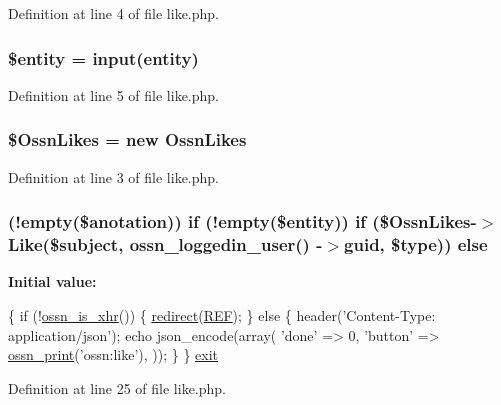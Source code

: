 Definition at line 4 of file like.\+php.

\subsubsection[{\texorpdfstring{\$entity}{$entity}}]{\setlength{\rightskip}{0pt plus 5cm}\$entity = {\bf input}(\textquotesingle{}entity\textquotesingle{})}\hypertarget{post_2like_8php_a74ed34e6d7bc9f3f8c4fb58a12247ee2}{}\label{post_2like_8php_a74ed34e6d7bc9f3f8c4fb58a12247ee2}


Definition at line 5 of file like.\+php.

\subsubsection[{\texorpdfstring{\$\+Ossn\+Likes}{$OssnLikes}}]{\setlength{\rightskip}{0pt plus 5cm}\${\bf Ossn\+Likes} = new {\bf Ossn\+Likes}}\hypertarget{post_2like_8php_a227f36ff099a95468945a2fabc5c0782}{}\label{post_2like_8php_a227f36ff099a95468945a2fabc5c0782}


Definition at line 3 of file like.\+php.

\subsubsection[{\texorpdfstring{else}{else}}]{ (!empty(\$anotation)) {\bf if} (!empty(\$entity)) {\bf if} (\${\bf Ossn\+Likes}-\/$>$Like(\$subject, {\bf ossn\+\_\+loggedin\+\_\+user}() -\/$>$guid, \${\bf type})) else}\hypertarget{post_2like_8php_a3aaa36ba6f23d1f679c0e517506ae7b6}{}\label{post_2like_8php_a3aaa36ba6f23d1f679c0e517506ae7b6}
{\bfseries Initial value\+:}
\begin{DoxyCode}
\{
    \textcolor{keywordflow}{if} (!\hyperlink{ossn_8lib_8system_8php_ac764e738f5c840432bbe4771e4fa27a7}{ossn\_is\_xhr}()) \{
        \hyperlink{ossn_8lib_8system_8php_a33cafdb93398ec540993c12c1daa0c48}{redirect}(\hyperlink{ossn_8lib_8system_8php_a6141904c50990cdd468f07046f29bb5c}{REF});
    \} \textcolor{keywordflow}{else} \{
        header(\textcolor{stringliteral}{'Content-Type: application/json'});
        echo json\_encode(array(
                \textcolor{stringliteral}{'done'} => 0,
                \textcolor{stringliteral}{'button'} => \hyperlink{ossn_8lib_8languages_8php_a2be5d1c4b695593a9b9067b96df2150a}{ossn\_print}(\textcolor{stringliteral}{'ossn:like'}),
            ));
    \}
\}
\hyperlink{register_8php_a6733eb5f605d09eaede9845835d71c4e}{exit}
\end{DoxyCode}


Definition at line 25 of file like.\+php.

